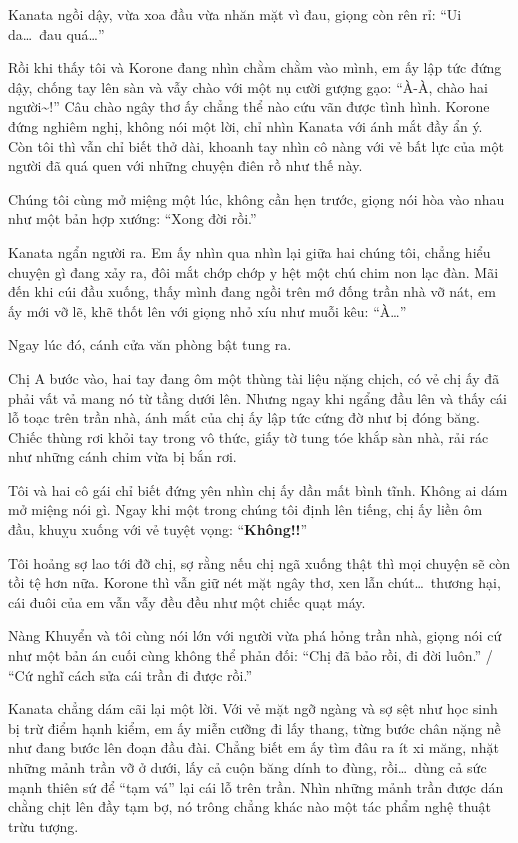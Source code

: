 \documentclass[../main.tex]{subfiles}
\begin{document}
Kanata ngồi dậy, vừa xoa đầu vừa nhăn mặt vì đau, giọng còn rên rỉ: ``Ui da\dots\ đau quá\dots''

Rồi khi thấy tôi và Korone đang nhìn chằm chằm vào mình, em ấy lập tức đứng dậy, chống tay lên sàn và vẫy chào với một nụ cười gượng gạo: ``À-À, chào hai người\~{}!'' Câu chào ngây thơ ấy chẳng thể nào cứu vãn được tình hình. Korone đứng nghiêm nghị, không nói một lời, chỉ nhìn Kanata với ánh mắt đầy ẩn ý. Còn tôi thì vẫn chỉ biết thở dài, khoanh tay nhìn cô nàng với vẻ bất lực của một người đã quá quen với những chuyện điên rồ như thế này.

Chúng tôi cùng mở miệng một lúc, không cần hẹn trước, giọng nói hòa vào nhau như một bản hợp xướng: ``Xong đời rồi.''

Kanata ngẩn người ra. Em ấy nhìn qua nhìn lại giữa hai chúng tôi, chẳng hiểu chuyện gì đang xảy ra, đôi mắt chớp chớp y hệt một chú chim non lạc đàn. Mãi đến khi cúi đầu xuống, thấy mình đang ngồi trên mớ đống trần nhà vỡ nát, em ấy mới vỡ lẽ, khẽ thốt lên với giọng nhỏ xíu như muỗi kêu: ``À\dots''

Ngay lúc đó, cánh cửa văn phòng bật tung ra.

Chị A bước vào, hai tay đang ôm một thùng tài liệu nặng chịch, có vẻ chị ấy đã phải vất vả mang nó từ tầng dưới lên. Nhưng ngay khi ngẩng đầu lên và thấy cái lỗ toạc trên trần nhà, ánh mắt của chị ấy lập tức cứng đờ như bị đóng băng. Chiếc thùng rơi khỏi tay trong vô thức, giấy tờ tung tóe khắp sàn nhà, rải rác như những cánh chim vừa bị bắn rơi.

Tôi và hai cô gái chỉ biết đứng yên nhìn chị ấy dần mất bình tĩnh. Không ai dám mở miệng nói gì. Ngay khi một trong chúng tôi định lên tiếng, chị ấy liền ôm đầu, khuỵu xuống với vẻ tuyệt vọng: ``\textbf{Không!!}''

Tôi hoảng sợ lao tới đỡ chị, sợ rằng nếu chị ngã xuống thật thì mọi chuyện sẽ còn tồi tệ hơn nữa. Korone thì vẫn giữ nét mặt ngây thơ, xen lẫn chút\dots\ thương hại, cái đuôi của em vẫn vẫy đều đều như một chiếc quạt máy.

Nàng Khuyển và tôi cùng nói lớn với người vừa phá hỏng trần nhà, giọng nói cứ như một bản án cuối cùng không thể phản đối: ``Chị đã bảo rồi, đi đời luôn.'' / ``Cứ nghĩ cách sửa cái trần đi được rồi.''

Kanata chẳng dám cãi lại một lời. Với vẻ mặt ngỡ ngàng và sợ sệt như học sinh bị trừ điểm hạnh kiểm, em ấy miễn cưỡng đi lấy thang, từng bước chân nặng nề như đang bước lên đoạn đầu đài. Chẳng biết em ấy tìm đâu ra ít xi măng, nhặt những mảnh trần vỡ ở dưới, lấy cả cuộn băng dính to đùng, rồi\dots\ dùng cả sức mạnh thiên sứ để ``tạm vá'' lại cái lỗ trên trần. Nhìn những mảnh trần được dán chằng chịt lên đầy tạm bợ, nó trông chẳng khác nào một tác phẩm nghệ thuật trừu tượng.
\end{document}
